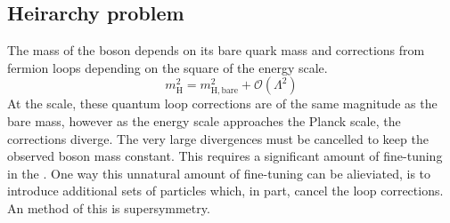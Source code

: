 \subsection{Heirarchy problem} %
\label{sub:heirarchy_problem}

The mass of the \Hboson{} boson depends on its bare quark mass and corrections from fermion loops depending on the square of the energy scale.
\begin{equation*}
	m_{\mathrm{H}}^{2} = m_{\mathrm{H, bare}}^{2} + \mathcal{O}(\Lambda^{2})
\end{equation*}
At the \EWK{} scale, these quantum loop corrections are of the same magnitude as the bare mass, however as the energy scale approaches the Planck scale, the corrections diverge.
The very large divergences must be cancelled to keep the observed \Hboson{} boson mass constant.
This requires a significant amount of fine-tuning in the \SM{}.
One way this unnatural amount of fine-tuning can be alieviated, is to introduce additional sets of particles which, in part, cancel the loop corrections.
An method of this is supersymmetry.


